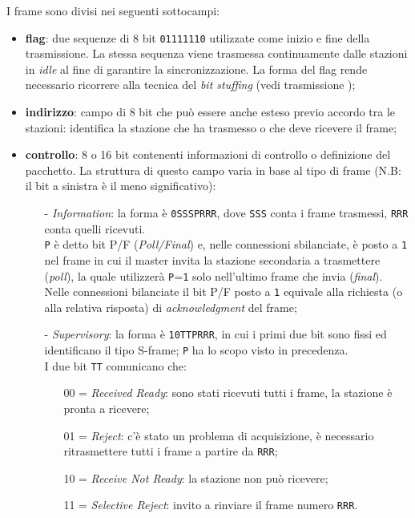 \documentclass[a4paper, twoside]{article}
\def\code#1{\texttt{#1}}
\def\vedi#1{\nameref{#1}}
\def\italic#1{\textit{#1}}
\begin{document}
I frame sono divisi nei seguenti sottocampi:
\begin{itemize}
	\item \textbf{flag}: due sequenze di 8 bit \code{01111110} utilizzate come inizio e fine della trasmissione. La stessa sequenza viene trasmessa continuamente dalle stazioni in \italic{idle} al fine di garantire la sincronizzazione.
	La forma del flag rende necessario ricorrere alla tecnica del \italic{bit stuffing} (vedi trasmissione \vedi{Orientata al bit});
	\item \textbf{indirizzo}: campo di 8 bit che può essere anche esteso previo accordo tra le stazioni: identifica la stazione che ha trasmesso o che deve ricevere il frame;
	\item \textbf{controllo}: 8 o 16 bit contenenti informazioni di controllo o definizione del pacchetto. La struttura di questo campo varia in base al tipo di frame (N.B: il bit a sinistra è il meno significativo):
	\begin{itemize}
		\item[-]\italic{Information}: la forma è \code{0SSSPRRR}, dove \code{SSS} conta i frame trasmessi, \code{RRR} conta quelli ricevuti.
		\\\code{P} è detto bit P/F (\italic{Poll/Final}) e, nelle connessioni sbilanciate, è posto a \code{1} nel frame in cui il master invita la stazione secondaria a trasmettere (\italic{poll}), la quale utilizzerà \code{P}=\code{1} solo nell'ultimo frame che invia (\italic{final}).
		Nelle connessioni bilanciate il bit P/F posto a \code{1} equivale alla richiesta (o alla relativa risposta) di \textit{acknowledgment} del frame;
		
		\item[-]\italic{Supervisory}: la forma è \code{10TTPRRR}, in cui i primi due bit sono fissi ed identificano il tipo S-frame; \code{P} ha lo scopo visto in precedenza.
		\\I due bit \code{TT} comunicano che:
		\begin{itemize}
			\item[00]= \italic{Received Ready}: sono stati ricevuti tutti i frame, la stazione è pronta a ricevere;
			\item[01]= \italic{Reject}: c'è stato un problema di acquisizione, è necessario ritrasmettere tutti i frame a partire da \code{RRR};
			\item[10]= \italic{Receive Not Ready}: la stazione non può ricevere;
			\item[11]= \italic{Selective Reject}: invito a rinviare il frame numero \code{RRR}.
		\end{itemize}
		

\end{itemize}
\end{itemize}
\end{document}
